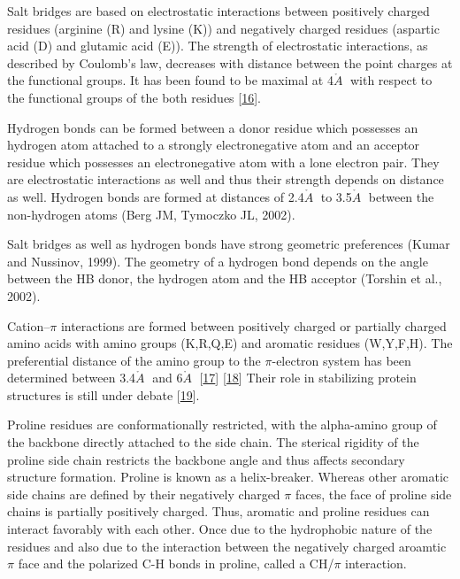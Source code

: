 \documentclass[12pt,a4paper,twoside]{book}
\newcommand{\angstrom}{\mathring{A} \;}
\theoremstyle{definition}
\theoremstyle{definition}
\theoremstyle{remark}
\begin{document}
Salt bridges are based on electrostatic interactions between positively
charged residues (arginine (R) and lysine (K)) and negatively charged
residues (aspartic acid (D) and glutamic acid (E)). The strength of
electrostatic interactions, as described by Coulomb's law, decreases
with distance between the point charges at the functional groups. It has
been found to be maximal at 4\(\angstrom\) with respect to the
functional groups of the both residues
{[}\protect\hyperlink{ref-Donald2011}{16}{]}.

Hydrogen bonds can be formed between a donor residue which possesses an
hydrogen atom attached to a strongly electronegative atom and an
acceptor residue which possesses an electronegative atom with a lone
electron pair. They are electrostatic interactions as well and thus
their strength depends on distance as well. Hydrogen bonds are formed at
distances of 2.4\(\angstrom\) to 3.5\(\angstrom\) between the
non-hydrogen atoms (Berg JM, Tymoczko JL, 2002).

Salt bridges as well as hydrogen bonds have strong geometric preferences
(Kumar and Nussinov, 1999). The geometry of a hydrogen bond depends on
the angle between the HB donor, the hydrogen atom and the HB acceptor
(Torshin et al., 2002).

Cation--\(\pi\) interactions are formed between positively charged or
partially charged amino acids with amino groups (K,R,Q,E) and aromatic
residues (W,Y,F,H). The preferential distance of the amino group to the
\(\pi\)-electron system has been determined between 3.4\(\angstrom\) and
6\(\angstrom\) {[}\protect\hyperlink{ref-Burley1986}{17}{]}
{[}\protect\hyperlink{ref-Crowley2005}{18}{]} Their role in stabilizing
protein structures is still under debate
{[}\protect\hyperlink{ref-Slutsky2004}{19}{]}.

Proline residues are conformationally restricted, with the alpha-amino
group of the backbone directly attached to the side chain. The sterical
rigidity of the proline side chain restricts the backbone angle and thus
affects secondary structure formation. Proline is known as a
helix-breaker. Whereas other aromatic side chains are defined by their
negatively charged \(\pi\) faces, the face of proline side chains is
partially positively charged. Thus, aromatic and proline residues can
interact favorably with each other. Once due to the hydrophobic nature
of the residues and also due to the interaction between the negatively
charged aroamtic \(\pi\) face and the polarized C-H bonds in proline,
called a CH/\(\pi\) interaction.
\end{document}
